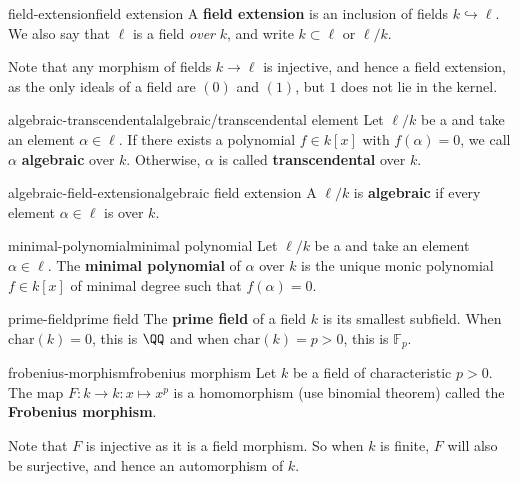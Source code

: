 \begin{topic}{field-extension}{field extension}
    A \textbf{field extension} is an inclusion of fields $k \hookrightarrow \ell$. We also say that $\ell$ is a field \textit{over} $k$, and write $k \subset \ell$ or $\ell / k$.
    
    Note that any morphism of fields $k \to \ell$ is injective, and hence a field extension, as the only ideals of a field are $(0)$ and $(1)$, but $1$ does not lie in the kernel.
\end{topic}

\begin{topic}{algebraic-transcendental}{algebraic/transcendental element}
    Let $\ell / k$ be a  and take an element $\alpha \in \ell$. If there exists a polynomial $f \in k[x]$ with $f(\alpha) = 0$, we call $\alpha$ \textbf{algebraic} over $k$. Otherwise, $\alpha$ is called \textbf{transcendental} over $k$.
\end{topic}

\begin{topic}{algebraic-field-extension}{algebraic field extension}
    A  $\ell / k$ is \textbf{algebraic} if every element $\alpha \in \ell$ is  over $k$.
\end{topic}

\begin{topic}{minimal-polynomial}{minimal polynomial}
    Let $\ell / k$ be a  and take an  element $\alpha \in \ell$. The \textbf{minimal polynomial} of $\alpha$ over $k$ is the unique monic polynomial $f \in k[x]$ of minimal degree such that $f(\alpha) = 0$.
\end{topic}

\begin{topic}{prime-field}{prime field}
    The \textbf{prime field} of a field $k$ is its smallest subfield. When $\text{char}(k) = 0$, this is $\QQ$ and when $\text{char}(k) = p > 0$, this is $\mathbb{F}_p$.
\end{topic}

\begin{topic}{frobenius-morphism}{frobenius morphism}
    Let $k$ be a field of characteristic $p > 0$. The map $F : k \to k : x \mapsto x^p$ is a homomorphism (use binomial theorem) called the \textbf{Frobenius morphism}.
    
    Note that $F$ is injective as it is a field morphism. So when $k$ is finite, $F$ will also be surjective, and hence an automorphism of $k$. 
\end{topic}

